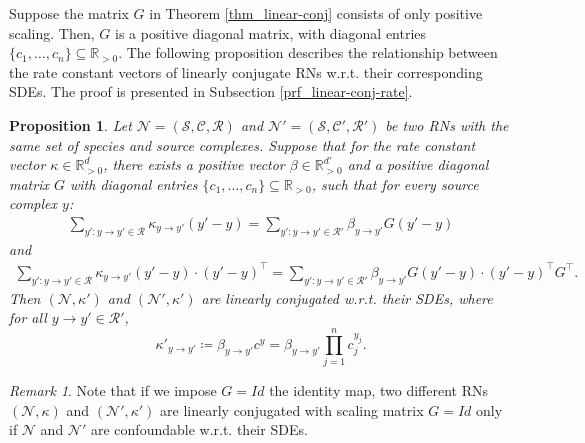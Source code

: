 \documentclass[10pt,a4paper]{amsart}
\newtheorem{proposition}[theorem]{Proposition}
\theoremstyle{definition}
\theoremstyle{remark}
\newtheorem{remark}[theorem]{Remark}
\theoremstyle{consequence}
\def\k{\kappa}
\def\cN{\mathcal{N}}
\def\cR{\mathcal{R}}
\def\cS{\mathcal{S}}
\def\cC{\mathcal{C}}
\def\R{\mathbb{R}}
\numberwithin{equation}{section}
\begin{document}
Suppose the matrix $G$ in Theorem \ref{thm_linear-conj} consists of only positive scaling. Then, $G$ is a positive diagonal matrix, with diagonal entries $\{c_1, \dots, c_n\} \subseteq \R_{> 0}$. The following proposition describes the relationship between the rate constant vectors of linearly conjugate RNs w.r.t. their corresponding SDEs. The proof is presented in Subsection \ref{prf_linear-conj-rate}.

\begin{proposition}\label{prop_linear-conj-rate}
    Let $\cN = (\cS, \cC, \cR)$ and $\cN' = (\cS, \cC', \cR')$ be two RNs with the same set of species and source complexes. Suppose that for the rate constant vector $\k \in \R_{> 0}^d$, there exists a positive vector $\beta \in \R_{> 0}^{d'}$ and a positive diagonal matrix $G$ with diagonal entries $\{c_1, \dots, c_n\} \subseteq \R_{> 0}$, such that for every source complex $y$:
    \begin{align}\label{eq_linear-conj-1}
    \sum_{y' \colon y\to y'\in \cR}\k_{y\to y'}(y' - y) =\sum_{y' \colon y\to y'\in \cR'}\beta_{y\to y'} G (y' - y) 
    \end{align}
    and 
       \begin{align}\label{eq_linear-conj-2}
       \sum_{y' \colon y\to y'\in \cR}\k_{y\to y'}(y' - y) \cdot (y' - y)^{\intercal} = \sum_{y' \colon y\to y'\in \cR'} \beta_{y\to y'} G (y' - y) \cdot (y' - y)^{\intercal} G^{\intercal}.  
       \end{align}
      Then $(\cN, \k')$ and $(\cN{{'}}, \k')$ are linearly conjugated w.r.t. their SDEs, where for all $y \to y' \in \cR'$,
       \begin{equation}\label{rates_conjugated_RN}
           \k'_{y\to y'} \coloneqq \beta_{y\to y'} c^y = \beta_{y\to y'}  \prod_{j=1}^n c_j^{y_{j}}.
       \end{equation}
       
\end{proposition}

\begin{remark}
Note that if we impose $G=Id$ the identity map, two different RNs $(\cN, \k)$ and $(\cN',\k')$ are linearly conjugated with scaling matrix $G = Id$ only if $\cN$ and $\cN'$ are confoundable w.r.t. their  SDEs.
\end{remark}
\end{document}
